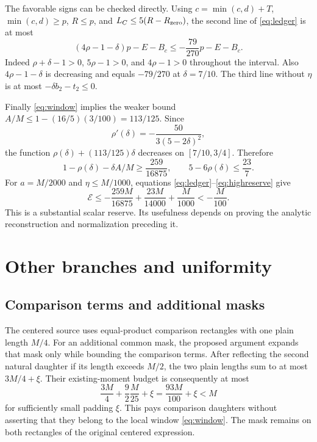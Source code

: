 \documentclass[11pt]{article}
\theoremstyle{definition}
\begin{document}
The favorable signs can be checked directly. Using
$c=\min(c,d)+T$, $\min(c,d)\ge p$, $R\le p$, and
$L_C\le5(R-R_{\rm zero})$, the second line of \eqref{eq:ledger} is at
most
\[
 (4\rho-1-\delta)p-E-B_c
 \le-\frac{79}{270}p-E-B_c.
\]
Indeed $\rho+\delta-1>0$, $5\rho-1>0$, and $4\rho-1>0$ throughout
the interval. Also $4\rho-1-\delta$ is decreasing and equals
$-79/270$ at $\delta=7/10$. The third line without $\eta$ is at most
$-\delta b_2-t_2\le0$.

Finally \eqref{eq:window} implies the weaker bound
$A/M\le1-(16/5)(3/100)=113/125$. Since
\[
 \rho'(\delta)=-\frac{50}{3(5-2\delta)^2},
\]
the function $\rho(\delta)+(113/125)\delta$ decreases on
$[7/10,3/4]$. Therefore
\begin{equation}\label{eq:highreserve}
 1-\rho(\delta)-\delta A/M\ge\frac{259}{16875},\qquad
 5-6\rho(\delta)\le\frac{23}{7}.
\end{equation}
For $a=M/2000$ and $\eta\le M/1000$, equations
\eqref{eq:ledger}--\eqref{eq:highreserve} give
\[
 \mathcal E\le
 -\frac{259M}{16875}+\frac{23M}{14000}+\frac M{1000}
 <-\frac M{100}.
\]
This is a substantial scalar reserve. Its usefulness depends on proving
the analytic reconstruction and normalization preceding it.

\section{Other branches and uniformity}\label{sec:interfaces}

\subsection{Comparison terms and additional masks}
The centered source uses equal-product comparison rectangles with one
plain length $M/4$. For an additional common mask, the proposed argument
expands that mask only while bounding the comparison terms. After
reflecting the second natural daughter if its length exceeds $M/2$, the
two plain lengths sum to at most $3M/4+\xi$. Their existing-moment
budget is consequently at most
\[
 \frac{3M}{4}+\frac92\frac M{25}+\xi
 =\frac{93M}{100}+\xi<M
\]
for sufficiently small padding $\xi$. This pays comparison daughters
without asserting that they belong to the local window
\eqref{eq:window}. The mask remains on both rectangles of the original
centered expression.
\end{document}
